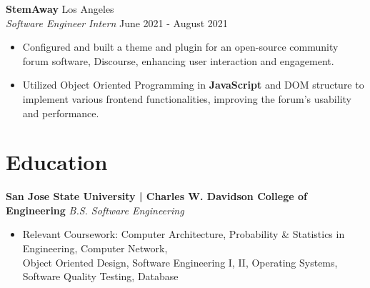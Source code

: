 \documentclass[a4paper,10pt]{article}
\begin{document}
\vspace{3mm}

\noindent \textbf{StemAway} \hfill {Los Angeles}\\
\textit{Software Engineer Intern} \hfill {June 2021 - August 2021}\vspace{-\baselineskip}
\vspace{2.5mm}
\begin{itemize}
    \item Configured and built a theme and plugin for an open-source community forum software, Discourse, enhancing user interaction and engagement.\vspace{0.3ex}
    \item Utilized Object Oriented Programming in \textbf{JavaScript} and DOM structure to implement various frontend functionalities, improving the forum’s usability and performance.\vspace{0.3ex}
\end{itemize}

\vspace{3mm}

\section*{Education}\vspace{0.5mm}
\noindent \textbf{San Jose State University | Charles W. Davidson College of Engineering} \hfill \textit{B.S. Software Engineering} \hfill 
\begin{itemize}
    \item Relevant Coursework: Computer Architecture, Probability \& Statistics in Engineering, Computer Network,\\Object Oriented Design, Software Engineering I, II, Operating Systems, Software Quality Testing, Database
\end{itemize}
\end{document}
